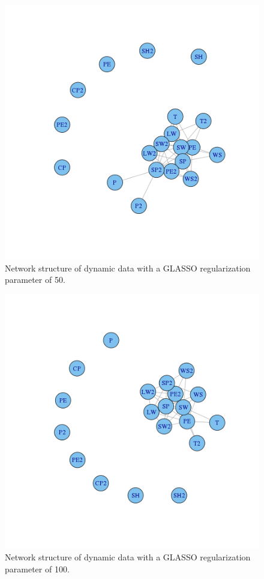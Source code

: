 \documentclass{article}
\begin{document}
\begin{figure}
\includegraphics[width=0.9\columnwidth]{images/dynamic_50.png}
\caption{Network structure of dynamic data with a GLASSO regularization parameter of 50.}
\label{fig:dynamic_50}
\end{figure}

\begin{figure}
\includegraphics[width=0.9\columnwidth]{images/dynamic_100.png}
\caption{Network structure of dynamic data with a GLASSO regularization parameter of 100.}
\label{fig:dynamic_100}
\end{figure}
\end{document}
